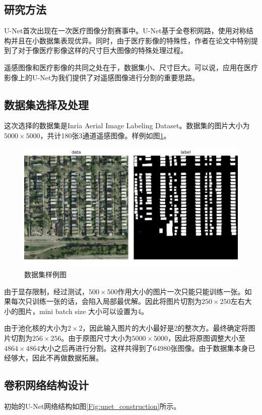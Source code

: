 \begin{spacing}{2}
    \section{研究方法}
\end{spacing}
U-Net首次出现在一次医疗图像分割赛事中。U-Net基于全卷积网路，使用对称结构并且在小数据集表现优异。同时，由于医疗影像的特殊性，作者在论文中特别提到了对于像医疗影像这样的尺寸巨大图像的特殊处理过程。

遥感图像和医疗影像的共同之处在于，数据集小、尺寸巨大。可以说，应用在医疗影像上的U-Net为我们提供了对遥感图像进行分割的重要思路。
\subsection{数据集选择及处理}
这次选择的数据集是Inria Aerial Image Labeling Dataset\cite{maggiori2017dataset}。数据集的图片大小为$5000\times 5000$，共计180张3通道遥感图像。样例如图\ref{Fig:sample_dataset}。

\begin{figure}[!t]
		\centering
		\includegraphics[scale=0.5]{Figures/sample_dataset.png}
		\caption{数据集样例图}
		\label{Fig:sample_dataset}
\end{figure}

由于显存限制，经过测试，$500\times 500$作用大小的图片一次只能只能训练一张。如果每次只训练一张的话，会陷入局部最优解。因此将图片切割为$250\times 250$左右大小的图片，mini batch size 大小可以设置为4。

由于池化核的大小为$2\times 2$，因此输入图片的大小最好是2的整次方。最终确定将图片切割为$256\times 256$。由于原图尺寸大小为$5000\times 5000$，因此将原图调整大小至$4864\times 4864$大小之后再进行分割。这样共得到了64980张图像。由于数据集本身已经够大，因此不再做数据拓展。
\subsection{卷积网络结构设计}
初始的U-Net网络结构如图\ref{Fig:unet_construction}所示。

